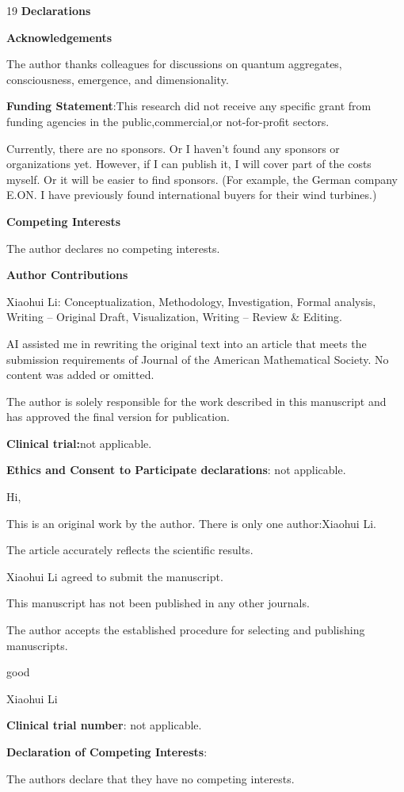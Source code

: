 \documentclass[11pt,a4paper]{article}
\theoremstyle{definition}
\begin{document}
\begin{thebibliography}{19}
\textbf{\textbf{Declarations}}

  
  
  \textbf{\textbf{Acknowledgements}}

The author thanks colleagues for discussions on quantum aggregates, consciousness, emergence, and dimensionality. 

 \textbf{\textbf{Funding Statement}}:This research did not receive any specific grant from funding agencies in the public,commercial,or not-for-profit sectors.

Currently, there are no sponsors. Or I haven't found any sponsors or organizations yet. However, if I can publish it, I will cover part of the costs myself. Or it will be easier to find sponsors. (For example, the German company E.ON. I have previously found international buyers for their wind turbines.)

 \textbf{\textbf{Competing Interests}}

The author declares no competing interests.

 \textbf{\textbf{Author Contributions}}

Xiaohui Li: Conceptualization, Methodology, Investigation, Formal analysis, Writing – Original Draft, Visualization, Writing – Review \& Editing.

AI assisted me in rewriting the original text into an article that meets the submission requirements of Journal of the American Mathematical Society. No content was added or omitted.

 The author is solely responsible for the work described in this manuscript and has approved the final version for publication.

 \textbf{\textbf{Clinical trial:}}not applicable.

 \textbf{\textbf{Ethics and Consent to Participate declarations}}: not applicable.

 Hi,

This is an original work by the author. There is only one author:Xiaohui Li.

The article accurately reflects the scientific results.

Xiaohui Li agreed to submit the manuscript.

This manuscript has not been published in any other journals.

The author accepts the established procedure for selecting and publishing manuscripts.

good

Xiaohui Li



 \textbf{\textbf{Clinical trial number}}: not applicable.
 
 \textbf{\textbf{Declaration of Competing Interests}}: 

The authors declare that they have no competing interests.


\end{thebibliography}
\end{document}
